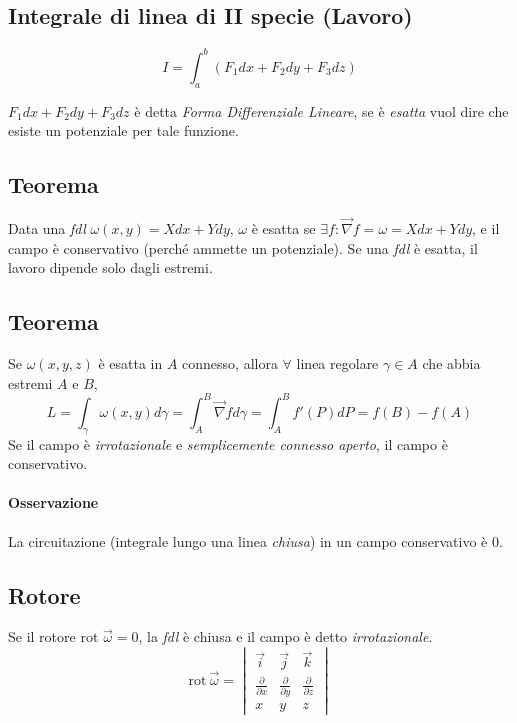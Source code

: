 \documentclass[10pt,a4paper,fleqn]{article}
\begin{document}
	\subsection{Integrale di linea di II specie (Lavoro)}

	\begin{equation}
	I=\int_a^b(F_1dx + F_2dy + F_3dz)
	\end{equation}

	$F_1dx + F_2dy + F_3dz$ è detta \emph{Forma Differenziale Lineare}, se è \emph{esatta} vuol dire che esiste un potenziale per tale funzione.

	\subsection{Teorema}

	Data una \emph{fdl} $\omega(x,y)=Xdx+Ydy$, $\omega$ è esatta se $\exists f: \vec{\nabla}f=\omega=Xdx+Ydy$, e il campo è conservativo (perché ammette un potenziale). Se una \emph{fdl} è esatta, il lavoro dipende solo dagli estremi.

	\subsection{Teorema}

	Se $\omega(x,y,z)$ è esatta in $A$ connesso, allora $\forall$ linea regolare $\gamma\in A$ che abbia estremi $A$ e $B$,
	\begin{equation}
	L=\int_{\gamma}\omega(x,y)d\gamma = \int_A^B\vec{\nabla}fd\gamma=\int_A^B f'(P)dP=f(B)-f(A)
	\end{equation}
	Se il campo è \emph{irrotazionale} e \emph{semplicemente connesso aperto}, il campo è conservativo.
	\paragraph{Osservazione} La circuitazione (integrale lungo una linea \emph{chiusa}) in un campo conservativo è $0$.

	\subsection{Rotore}

	Se il rotore rot $\vec\omega=0$, la \emph{fdl} è chiusa e il campo è detto \emph{irrotazionale}.
	\begin{equation}
	\text{rot}\:\vec\omega=\begin{vmatrix}
	\vec i & \vec j & \vec k\\
	\frac{\partial}{\partial x} & 	\frac{\partial}{\partial y} & \frac{\partial}{\partial z}\\
	x & y & z
	\end{vmatrix}
	\end{equation}
\end{document}
